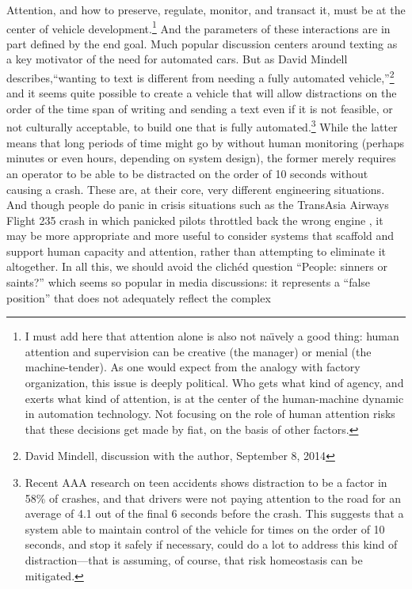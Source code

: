 Attention, and how to preserve, regulate, monitor, and transact it,
must be at the center of vehicle development.\footnote{I must add here
that attention alone is also not na\"{\i}vely a good thing:
human attention and supervision can be creative (the manager) or
menial (the machine-tender). As one would expect from the analogy with
factory organization, this issue is deeply political. Who gets what
kind of agency, and exerts what kind of attention, is at the center of
the human-machine dynamic in automation technology. Not focusing on
the role of human attention risks that these decisions get made
by fiat, on the basis of other factors.} And the parameters of
these interactions are in part defined by the end goal. Much popular
discussion centers around texting as a key motivator of the need for
automated cars. But as 
David Mindell describes,``wanting to text is different
from needing a fully automated vehicle,''\footnote{David Mindell,
  discussion with the author, September 8, 2014} and it seems quite possible
to create a vehicle that will allow distractions on the order of the
time span of writing and sending a text even if it is not feasible, or
not culturally acceptable, to build one that is fully
automated.\footnote{Recent AAA research on teen accidents shows
  distraction to be a factor in 58\% of crashes, and that drivers were
not paying attention to the road for an average of 4.1 out of the
final 6 seconds before the crash. This suggests that a system able to
maintain control of the vehicle for times on the order of 10 seconds,
and stop it safely if necessary, could do a lot to address this kind
of distraction---that is assuming, of course, that risk homeostasis
can be mitigated.} While
the latter means that long periods of time might go by without human
monitoring (perhaps minutes or even hours, depending on system
design), the former merely requires an operator to be able to be 
distracted on the order of 10 seconds without causing a crash. These
are, at their core, very different engineering situations. And though
people do panic in crisis situations such as the TransAsia Airways
Flight 235 crash in which panicked pilots throttled back the wrong
engine \cite{???-http://m.nautil.us/issue/23/dominoes/fear-in-the-cockpit}, it may be more appropriate and more useful to consider systems
that scaffold and support human capacity and attention, rather than
attempting to eliminate it altogether. In
all this, we should avoid the clich\'{e}d question ``People: sinners
or saints?'' which seems so popular in media discussions: it represents
a ``false position'' that does not adequately reflect the complex
